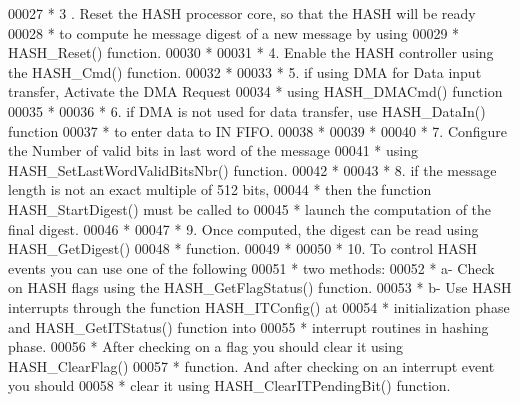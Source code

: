 \begin{DoxyCode}
00027 \textcolor{comment}{  *         3 . Reset the HASH processor core, so that the HASH will be ready }
00028 \textcolor{comment}{  *             to compute he message digest of a new message by using }
00029 \textcolor{comment}{  *             HASH\_Reset() function.}
00030 \textcolor{comment}{  *}
00031 \textcolor{comment}{  *         4. Enable the HASH controller using the HASH\_Cmd() function. }
00032 \textcolor{comment}{  *                }
00033 \textcolor{comment}{  *         5. if using DMA for Data input transfer, Activate the DMA Request }
00034 \textcolor{comment}{  *            using HASH\_DMACmd() function }
00035 \textcolor{comment}{  *                    }
00036 \textcolor{comment}{  *         6. if DMA is not used for data transfer, use HASH\_DataIn() function }
00037 \textcolor{comment}{  *            to enter data to IN FIFO.}
00038 \textcolor{comment}{  *             }
00039 \textcolor{comment}{  *          }
00040 \textcolor{comment}{  *         7. Configure the Number of valid bits in last word of the message }
00041 \textcolor{comment}{  *            using HASH\_SetLastWordValidBitsNbr() function.}
00042 \textcolor{comment}{  *             }
00043 \textcolor{comment}{  *         8. if the message length is not an exact multiple of 512 bits, }
00044 \textcolor{comment}{  *            then the function HASH\_StartDigest() must be called to }
00045 \textcolor{comment}{  *            launch the computation of the final digest.     }
00046 \textcolor{comment}{  *             }
00047 \textcolor{comment}{  *         9. Once computed, the digest can be read using HASH\_GetDigest() }
00048 \textcolor{comment}{  *            function.         }
00049 \textcolor{comment}{  *                   }
00050 \textcolor{comment}{  *        10. To control HASH events you can use one of the following }
00051 \textcolor{comment}{  *              two methods:}
00052 \textcolor{comment}{  *               a- Check on HASH flags using the HASH\_GetFlagStatus() function.  }
00053 \textcolor{comment}{  *               b- Use HASH interrupts through the function HASH\_ITConfig() at }
00054 \textcolor{comment}{  *                  initialization phase and HASH\_GetITStatus() function into }
00055 \textcolor{comment}{  *                  interrupt routines in hashing phase.}
00056 \textcolor{comment}{  *          After checking on a flag you should clear it using HASH\_ClearFlag()}
00057 \textcolor{comment}{  *          function. And after checking on an interrupt event you should }
00058 \textcolor{comment}{  *          clear it using HASH\_ClearITPendingBit() function.     }

\end{DoxyCode}
